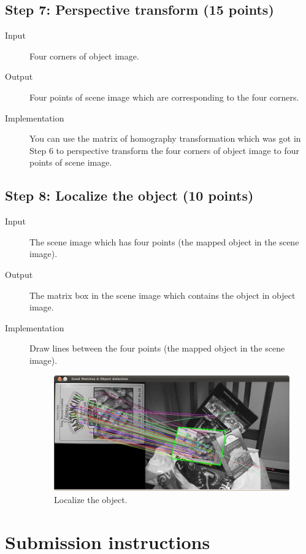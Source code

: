 \documentclass[12pt]{article}
\begin{document}
\subsection{Step 7: Perspective transform (15 points)}

\begin{description}
\item[Input] Four corners of object image.
\item[Output] Four points of scene image which are corresponding to the four corners.
\item[Implementation] You can use the matrix of homography transformation which was got in Step 6 to perspective transform the four corners of object image to four points of scene image.
\end{description}

\subsection{Step 8: Localize the object (10 points)}

\begin{description}
\item[Input] The scene image which has four points (the mapped object in the scene image).
\item[Output] The matrix box in the scene image which contains the object in object image.
\item[Implementation] Draw lines between the four points (the mapped object in the scene image).
\begin{figure}[!ht]
\centering
\includegraphics[height=0.3\textheight]{Result.jpg}
\caption{Localize the object.}
\label{fig:localize}
\end{figure}
\end{description}


\section{Submission instructions}
\end{document}

